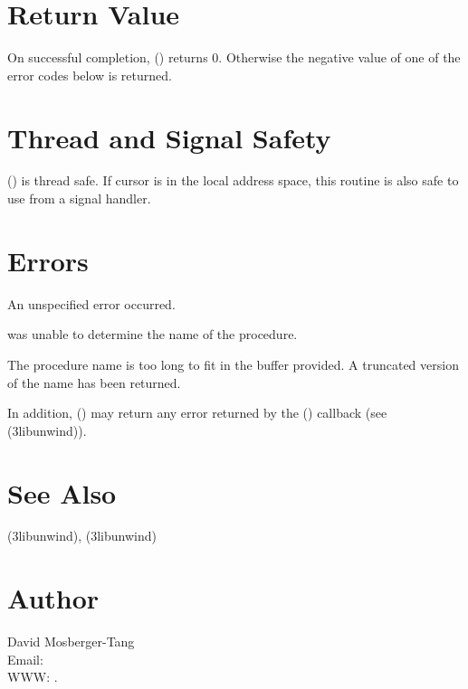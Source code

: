 \documentclass{article}
\begin{document}
\section{Return Value}

On successful completion, () returns 0.
Otherwise the negative value of one of the error codes below is
returned.

\section{Thread and Signal Safety}

() is thread safe.  If cursor  is
in the local address space, this routine is also safe to use from a
signal handler.

\section{Errors}

\begin{Description}
\item[\Const{UNW\_EUNSPEC}] An unspecified error occurred.
\item[\Const{UNW\_ENOINFO}]  was unable to determine
  the name of the procedure.
\item[\Const{UNW\_ENOMEM}] The procedure name is too long to fit
  in the buffer provided.  A truncated version of the name has been
  returned.
\end{Description}
In addition, () may return any error
returned by the () callback (see
(3libunwind)).

\section{See Also}

(3libunwind),
(3libunwind)

\section{Author}

\noindent
David Mosberger-Tang\\
Email: \\
WWW: .
\LatexManEnd
\end{document}
